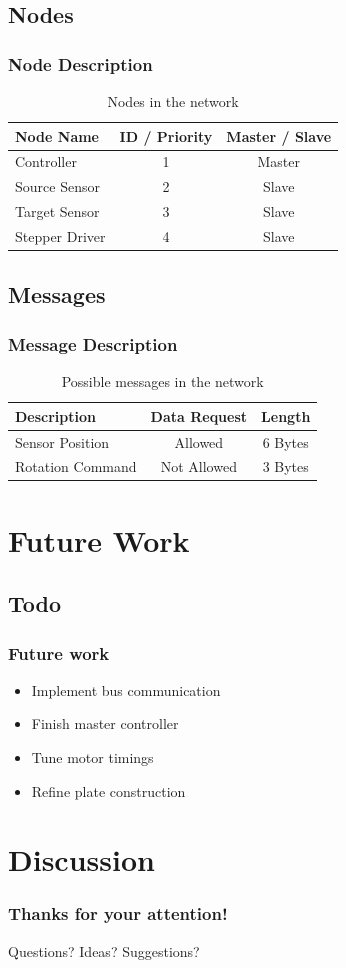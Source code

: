 \documentclass{beamer}
\begin{document}
\subsection{Nodes}
\begin{frame}
  \frametitle{Node Description}
	\begin{table}
\begin{tabular}{l | c | c }
Node Name & ID / Priority & Master / Slave \\
\hline \hline
Controller & 1 & Master \\
Source Sensor & 2 & Slave \\
Target Sensor & 3 & Slave \\
Stepper Driver & 4 & Slave
\end{tabular}
\caption{Nodes in the network}
\end{table}
\end{frame}

\subsection{Messages}
\begin{frame}
  \frametitle{Message Description}
	\begin{table}
\begin{tabular}{l | c | c }
Description & Data Request & Length \\
\hline \hline
Sensor Position & Allowed & 6 Bytes \\
Rotation Command & Not Allowed & 3 Bytes
\end{tabular}
\caption{Possible messages in the network}
\end{table}
\end{frame}

\section{Future Work}
\subsection{Todo}
\begin{frame}
  \frametitle{Future work}
  	\begin{itemize}
		\item Implement bus communication
		\item Finish master controller
		\item Tune motor timings
		\item Refine plate construction
	\end{itemize}
\end{frame}

\section{Discussion}
\begin{frame}
	\frametitle{Thanks for your attention!}
	\huge{Questions? Ideas? Suggestions?}
\end{frame}
\end{document}
